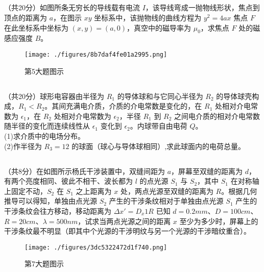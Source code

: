 \subsection{ }
（共20分）如图所条无穷长的导线载有电流 $I$，该导线弯成一抛物线形状，焦点到顶点的距离为 $a$，在图示 $xy$ 坐标系中，该抛物线的曲线方程为 $y^{2}=4ax$ 焦点 $F$ 在此坐标系中坐标为 $(x,y)=(a,0)$，真空中的磁导率为 $\mu_{0}$，求焦点 $F$ 处的磁感应强度 $B$。\\
\begin{figure}[ht]
\centering
\texttt{[image: ./figures/8b7daf4fe01a2995.png]}
\caption{第5大题图示} \label{fig_CAS20_3}
\end{figure}

\subsection{ }
（共20分）球形电容器由半径为 $R_1$ 的导体球和与它同心半径为 $R_2$ 的导体球壳构成，$R_1<R_2$。其间充满电介质，介质的介电常数是变化的，在 $R_1$ 处相对介电常数为 $\epsilon_1$，在 $R_2$ 处相对介电常数为 $\epsilon_2$，半径 $R_1$ 到 $R_2$ 之间电介质的相对介电常数随半径的变化而连续线性从 $\epsilon_1$ 变化到 $\epsilon_2$。内球带自由电荷 $Q$。\\
(1)求介质中的电场分布。\\
(2)作半径为 $R_{3}=12$ 的球面（球心与导体球相同）,求此球面内的电荷总量。\\

\subsection{ }
（共8分）在如图所示杨氏干涉装置中，双缝间距为 $a$，屏幕至双缝的距离为 $d$，有两个亮度相同、彼此不相干、波长都为 $l$ 的点光源 $S_1$ 与 $S_2$，其中 $S_1$ 在对称轴上固定不动，$S_2$ 在 $S_1$ 之上距离为 $x$ 处，两点光源至双缝的距离为 $R$。根据几何推导可以得知，单独由点光源 $S_2$ 产生的干涉条纹相对于单独由点光源 $S_1$ 产生的干涉条纹会往方移动，移动距离为 $\Delta x'=D_{x}1R$ 已知 $d=0.2mm$、$D=100cm$、$R=20cm$、$\lambda =500nm$，试求当两点光源之间的距离 $x$ 至少为多少时，屏幕上的干涉条纹最不明显（即其中个光源的干涉明纹与另一个光源的干涉暗纹重合）。\\
\begin{figure}[ht]
\centering
\texttt{[image: ./figures/3dc5322472d1f740.png]}
\caption{第7大题图示} \label{fig_CAS20_4}
\end{figure}
